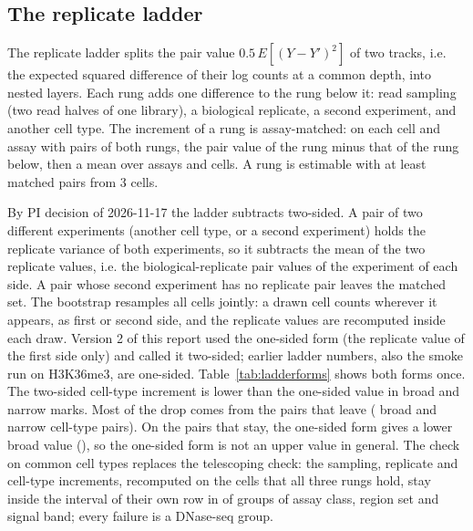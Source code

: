\documentclass[pdflatex,sn-mathphys-num]{sn-jnl}
\newcommand{\lit}[1]{#1}
\newcommand{\cl}[1]{#1}
\begin{document}
\subsection{The replicate ladder}

\cl{The replicate ladder splits the pair value $\lit{0.5}\,E[(Y-Y')^{\lit{2}}]$ of two tracks, i.e. the expected squared difference of their log counts at a common depth, into nested layers. Each rung adds one difference to the rung below it: read sampling (two read halves of one library), a biological replicate, a second experiment, and another cell type. The increment of a rung is assay-matched: on each cell and assay with pairs of both rungs, the pair value of the rung minus that of the rung below, then a mean over assays and cells. A rung is estimable with at least \minPairs{} matched pairs from \lit{3} cells.}

\cl{By PI decision of \lit{2026-11-17} the ladder subtracts two-sided. A pair of two different experiments (another cell type, or a second experiment) holds the replicate variance of both experiments, so it subtracts the mean of the two replicate values, i.e. the biological-replicate pair values of the experiment of each side. A pair whose second experiment has no replicate pair leaves the matched set. The bootstrap resamples all cells jointly: a drawn cell counts wherever it appears, as first or second side, and the replicate values are recomputed inside each draw. Version \lit{2} of this report used the one-sided form (the replicate value of the first side only) and called it two-sided; earlier ladder numbers, also the smoke run on \lit{H3K36me3}, are one-sided. Table~\ref{tab:ladderforms} shows both forms once. The two-sided cell-type increment is lower than the one-sided value in broad and narrow marks. Most of the drop comes from the pairs that leave (\ladBrCtLeft{} broad and \ladNrCtLeft{} narrow cell-type pairs). On the pairs that stay, the one-sided form gives a lower broad value (\ladKeptBrOne{}), so the one-sided form is not an upper value in general. The check on common cell types replaces the telescoping check: the sampling, replicate and cell-type increments, recomputed on the cells that all three rungs hold, stay inside the interval of their own row in \ladCcOk{} of \ladCcN{} groups of assay class, region set and signal band; every failure is a DNase-seq group.}
\end{document}
